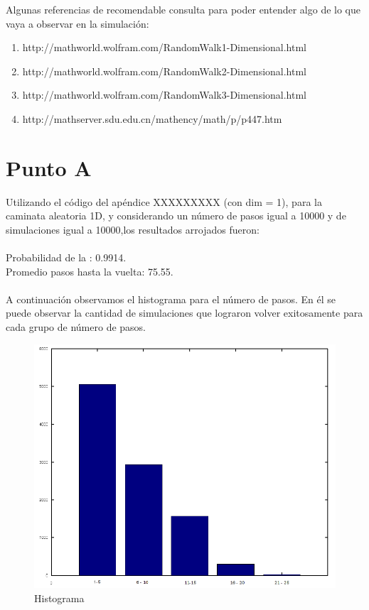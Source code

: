 \documentclass[a4paper,10pt]{article}
\begin{document}
Algunas referencias de recomendable consulta para poder entender algo de lo que vaya a observar en la simulaci\'on:
\begin{enumerate}
\item http://mathworld.wolfram.com/RandomWalk1-Dimensional.html
\item http://mathworld.wolfram.com/RandomWalk2-Dimensional.html
\item http://mathworld.wolfram.com/RandomWalk3-Dimensional.html
\item http://mathserver.sdu.edu.cn/mathency/math/p/p447.htm
\end{enumerate}
\newpage

\section{Punto A} 
Utilizando el c\'odigo del ap\'endice XXXXXXXXX (con dim = 1), para la caminata aleatoria 1D, y considerando un n\'umero de pasos igual a 10000 y 
de simulaciones igual a 10000,los resultados arrojados fueron:
\\
\\  Probabilidad de la : 0.9914.
\\  Promedio pasos hasta la vuelta: 75.55.
\\
\\ A continuaci\'on observamos el histograma para el n\'umero de pasos. En \'el se puede observar la cantidad de simulaciones que 
lograron volver exitosamente para cada grupo de n\'umero de pasos.
\begin{center}
  \begin{figure}[H]
  \includegraphics[scale=0.5]{./images/bar1edit.png}
    \caption{Histograma}
  \end{figure}
\end{center}
\end{document}
